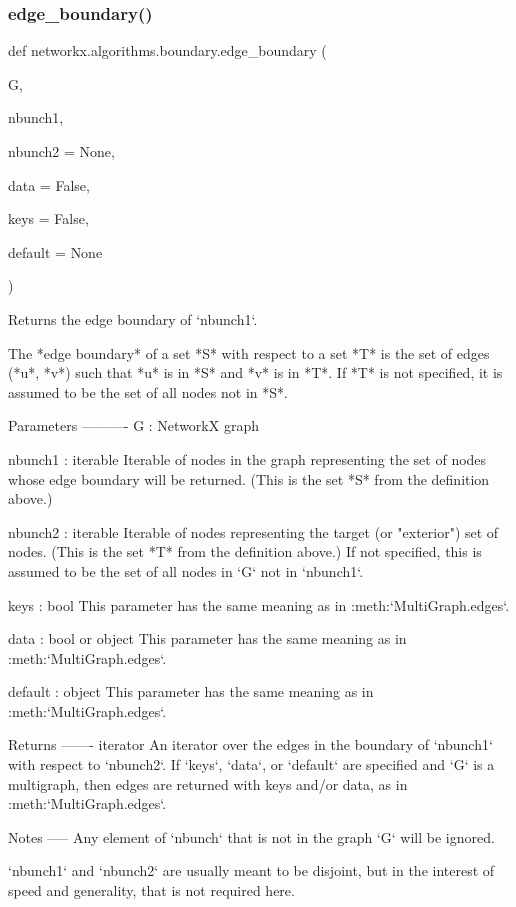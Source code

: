 \subsubsection{\texorpdfstring{edge\+\_\+boundary()}{edge\_boundary()}}
{\footnotesize\ttfamily def networkx.\+algorithms.\+boundary.\+edge\+\_\+boundary (\begin{DoxyParamCaption}\item[{}]{G,  }\item[{}]{nbunch1,  }\item[{}]{nbunch2 = {\ttfamily None},  }\item[{}]{data = {\ttfamily False},  }\item[{}]{keys = {\ttfamily False},  }\item[{}]{default = {\ttfamily None} }\end{DoxyParamCaption})}

\begin{DoxyVerb}Returns the edge boundary of `nbunch1`.

The *edge boundary* of a set *S* with respect to a set *T* is the
set of edges (*u*, *v*) such that *u* is in *S* and *v* is in *T*.
If *T* is not specified, it is assumed to be the set of all nodes
not in *S*.

Parameters
----------
G : NetworkX graph

nbunch1 : iterable
    Iterable of nodes in the graph representing the set of nodes
    whose edge boundary will be returned. (This is the set *S* from
    the definition above.)

nbunch2 : iterable
    Iterable of nodes representing the target (or "exterior") set of
    nodes. (This is the set *T* from the definition above.) If not
    specified, this is assumed to be the set of all nodes in `G`
    not in `nbunch1`.

keys : bool
    This parameter has the same meaning as in
    :meth:`MultiGraph.edges`.

data : bool or object
    This parameter has the same meaning as in
    :meth:`MultiGraph.edges`.

default : object
    This parameter has the same meaning as in
    :meth:`MultiGraph.edges`.

Returns
-------
iterator
    An iterator over the edges in the boundary of `nbunch1` with
    respect to `nbunch2`. If `keys`, `data`, or `default`
    are specified and `G` is a multigraph, then edges are returned
    with keys and/or data, as in :meth:`MultiGraph.edges`.

Notes
-----
Any element of `nbunch` that is not in the graph `G` will be
ignored.

`nbunch1` and `nbunch2` are usually meant to be disjoint, but in
the interest of speed and generality, that is not required here.\end{DoxyVerb}
 \mbox{\label{namespacenetworkx_1_1algorithms_1_1boundary_acc17d5483f9845383304f319285be86c}} 
